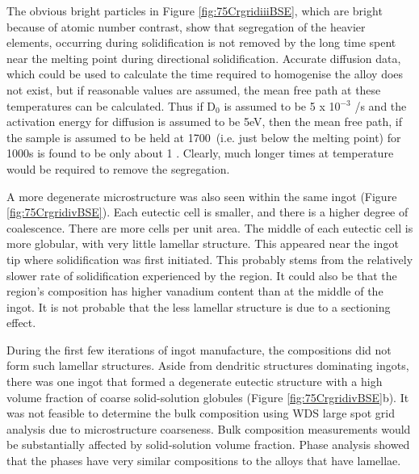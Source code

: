 The obvious bright particles in Figure \ref{fig:75CrgridiiiBSE}, which are bright because of atomic number contrast, show that segregation of the heavier elements, occurring during solidification is not removed by the long time spent near the melting point during directional solidification.  Accurate diffusion data, which could be used to calculate the time required to homogenise the alloy does not exist, but if reasonable values are assumed, the mean free path at these temperatures can be calculated.  Thus if D$_0$ is assumed to be 5 x 10$^{-3}$ \square\metre/s and the activation energy for diffusion is assumed to be 5eV, then the mean free path, if the sample is assumed to be held at 1700\celsius\ (i.e. just below the melting point) for 1000s is found to be only about 1 \micro\metre.  Clearly, much longer times at temperature would be required to remove the segregation.

A more degenerate microstructure was also seen within the same ingot (Figure \ref{fig:75CrgridivBSE}).  Each eutectic cell is smaller, and there is a higher degree of coalescence.  There are more cells per unit area.  The middle of each eutectic cell is more globular, with very little lamellar structure.  This appeared near the ingot tip where solidification was first initiated.  This probably stems from the relatively slower rate of solidification experienced by the region.  It could also be that the region's composition has higher vanadium content than at the middle of the ingot.  It is not probable that the less lamellar structure is due to a sectioning effect. 

During the first few iterations of ingot manufacture, the compositions did not form such lamellar structures.  Aside from dendritic structures dominating ingots, there was one ingot that formed a degenerate eutectic structure with a high volume fraction of coarse solid-solution globules (Figure \ref{fig:75CrgridivBSE}b).  It was not feasible to determine the bulk composition using WDS large spot grid analysis due to microstructure coarseness.  Bulk composition measurements would be substantially affected by solid-solution volume fraction.  Phase analysis showed that the phases have very similar compositions to the alloys that have lamellae.

